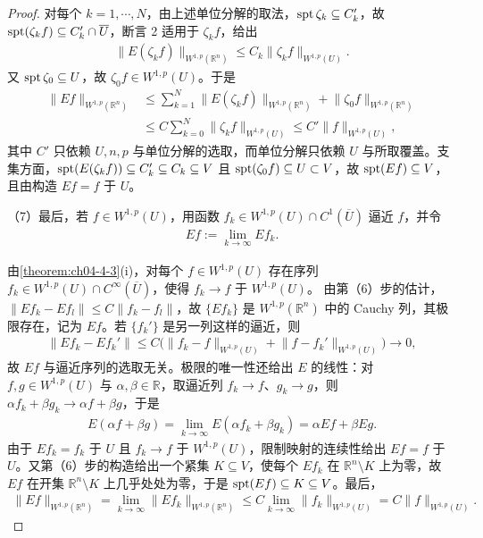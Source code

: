 \documentclass[../../main.tex]{subfiles}%
\begin{document}
\begin{proof}
对每个 $k=1,\cdots,N$，由上述单位分解的取法，$\operatorname{spt}\zeta_k\subseteq C'_k$，故 $\operatorname{spt}(\zeta_kf)\subseteq C'_k\cap\overline{U}$，断言 2 适用于 $\zeta_kf$，给出
\begin{align*}
\lVert E(\zeta_kf)\rVert_{W^{1,p}(\mathbb{R}^n)}\leqslant C_k\lVert\zeta_kf\rVert_{W^{1,p}(U)}.
\end{align*}
又 $\operatorname{spt}\zeta_0\subseteq U$，故 $\zeta_0f\in W^{1,p}(U)$。于是
\begin{align*}
\lVert Ef\rVert_{W^{1,p}(\mathbb{R}^n)}
&\leqslant\sum_{k=1}^{N}\lVert E(\zeta_kf)\rVert_{W^{1,p}(\mathbb{R}^n)}+\lVert\zeta_0f\rVert_{W^{1,p}(\mathbb{R}^n)}\\
&\leqslant C\sum_{k=0}^{N}\lVert\zeta_kf\rVert_{W^{1,p}(U)}\leqslant C'\lVert f\rVert_{W^{1,p}(U)},
\end{align*}
其中 $C'$ 只依赖 $U,n,p$ 与单位分解的选取，而单位分解只依赖 $U$ 与所取覆盖。支集方面，$\operatorname{spt}(E(\zeta_kf))\subseteq C'_k\subseteq C_k\subseteq V$ 且 $\operatorname{spt}(\zeta_0f)\subseteq U\subset V$，故 $\operatorname{spt}(Ef)\subseteq V$，且由构造 $Ef=f$ 于 $U$。

（7）最后，若 $f\in W^{1,p}(U)$，用函数 $f_k\in W^{1,p}(U)\cap C^1(\overline{U})$ 逼近 $f$，并令
\begin{align*}
Ef:=\lim_{k\to\infty}Ef_k.
\end{align*}

由\cref{theorem:ch04-4-3}(i)，对每个 $f\in W^{1,p}(U)$ 存在序列 $f_k\in W^{1,p}(U)\cap C^\infty(\overline{U})$，使得 $f_k\to f$ 于 $W^{1,p}(U)$。%
由第（6）步的估计，$\lVert Ef_k-Ef_l\rVert\leqslant C\lVert f_k-f_l\rVert$，故 $\{Ef_k\}$ 是 $W^{1,p}(\mathbb{R}^n)$ 中的 Cauchy 列，其极限存在，记为 $Ef$。若 $\{f_k'\}$ 是另一列这样的逼近，则
\begin{align*}
\lVert Ef_k-Ef_k'\rVert\leqslant C\bigl(\lVert f_k-f\rVert_{W^{1,p}(U)}+\lVert f-f_k'\rVert_{W^{1,p}(U)}\bigr)\to0,
\end{align*}
故 $Ef$ 与逼近序列的选取无关。极限的唯一性还给出 $E$ 的线性：对 $f,g\in W^{1,p}(U)$ 与 $\alpha,\beta\in\mathbb{R}$，取逼近列 $f_k\to f$、$g_k\to g$，则 $\alpha f_k+\beta g_k\to\alpha f+\beta g$，于是
\begin{align*}
E(\alpha f+\beta g)=\lim_{k\to\infty}E(\alpha f_k+\beta g_k)=\alpha Ef+\beta Eg.
\end{align*}
由于 $Ef_k=f_k$ 于 $U$ 且 $f_k\to f$ 于 $W^{1,p}(U)$，限制映射的连续性给出 $Ef=f$ 于 $U$。又第（6）步的构造给出一个紧集 $K\subseteq V$，使每个 $Ef_k$ 在 $\mathbb{R}^n\setminus K$ 上为零，故 $Ef$ 在开集 $\mathbb{R}^n\setminus K$ 上几乎处处为零，于是 $\operatorname{spt}(Ef)\subseteq K\subseteq V$。最后，
\begin{align*}
\lVert Ef\rVert_{W^{1,p}(\mathbb{R}^n)}=\lim_{k\to\infty}\lVert Ef_k\rVert_{W^{1,p}(\mathbb{R}^n)}\leqslant C\lim_{k\to\infty}\lVert f_k\rVert_{W^{1,p}(U)}=C\lVert f\rVert_{W^{1,p}(U)}.
\end{align*}
\end{proof}
\end{document}
